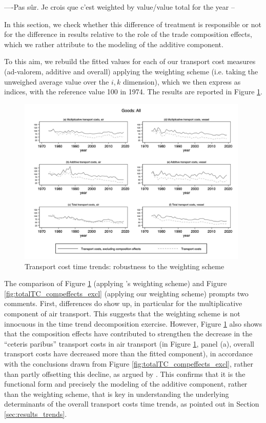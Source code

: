 \documentclass[a4paper,11pt]{article}
\begin{document}
----Pas sûr. Je crois que c’est weighted by value/value total for the year --

In this section, we check whether this difference of treatment is responsible or not for the difference in results relative to the role of the trade composition effects, which we rather attribute to the modeling of the additive component.

To this aim, we rebuild the fitted values for each of our transport cost measures (ad-valorem, additive and overall) applying the \cite{hummels2007} weighting scheme (i.e. taking the unweighed average value over the $i,k$ dimension), which we then express as indices, with the reference value 100 in 1974.
The results are reported in Figure \ref{fig:compeffects_robustness}.

\begin{figure}[htbp]
\caption{Transport cost time trends: robustness to the weighting scheme}
\label{fig:compeffects_robustness}
\begin{center}
\includegraphics[height=8cm]
{graph_composition_all_np.jpg}
\end{center}
\end{figure}

The comparison of Figure \ref{fig:compeffects_robustness} (applying \citealp{hummels2007}'s weighting scheme) and Figure \ref{fig:totalTC_compeffects_excl} (applying our weighting scheme) prompts two comments.
First, differences do show up, in particular for the multiplicative component of air transport.
This suggests that the weighting scheme is not innocuous in the time trend decomposition exercise.
However, Figure \ref{fig:compeffects_robustness} also shows that the composition effects have contributed to strengthen the decrease in the ``ceteris paribus'' transport costs in air transport (in Figure \ref{fig:compeffects_robustness}, panel (a), overall transport costs have decreased more than the fitted component), in accordance with the conclusions drawn from Figure \ref{fig:totalTC_compeffects_excl}, rather than partly offsetting this decline, as argued by \cite{hummels2007}.
This confirms that it is the functional form and precisely the modeling of the additive component, rather than the weighting scheme, that is key in understanding the underlying determinants of the overall transport costs time trends, as pointed out in Section \ref{sec:results_trends}.
\end{document}

